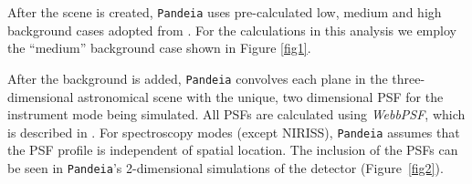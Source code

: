\documentclass[iop]{emulateapj}
\begin{document}
After the scene is created, \texttt{Pandeia} uses pre-calculated low, medium 
and high background cases adopted from \citet{gla15}. For the calculations in this analysis we employ the ``medium'' background
case shown in Figure \ref{fig1}. 

After the background is added, \texttt{Pandeia} convolves each plane in the 
three-dimensional astronomical scene with the unique, two dimensional PSF for 
the instrument mode being simulated. All PSFs are calculated using \emph{WebbPSF},
which is described in \citet{per11}. For spectroscopy modes (except NIRISS), \texttt{Pandeia} assumes 
that the PSF profile is independent of spatial location. The inclusion of the PSFs can be seen in \texttt{Pandeia}'s 2-dimensional simulations of the detector (Figure~\ref{fig2}). 
\end{document}
